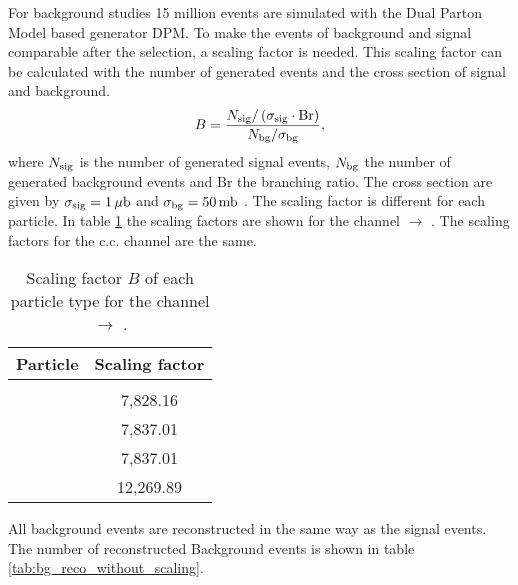 For background studies 15 million events are simulated with the Dual Parton Model based generator DPM.
To make the events of background and signal comparable after the selection, a scaling factor is needed.
This scaling factor can be calculated with the number of generated events and the cross section of signal and background.
\begin{equation}
		B = \frac{N_{\textnormal{sig}}/\left(\sigma_{\textnormal{sig}} \cdot \textnormal{Br}\right)}{N_{\textnormal{bg}}/\sigma_{\textnormal{bg}}},
\label{eq:bg_scaling}
\end{equation}
where $N_{\textnormal{sig}}$ is the number of generated signal events, $N_{\textnormal{bg}}$ the number of generated background events and Br the 
branching ratio. The cross section are given by $\sigma_{\textnormal{sig}} = 1\,\mu\textnormal{b}$ and $\sigma_{\textnormal{bg}} = 50\, \textnormal{mb}$ \cite{PANDAphysics2009}.
The scaling factor is different for each particle.
In table \ref{tab:bg_scaling} the scaling factors are shown for the channel \pbarpSystem $\rightarrow$ \excitedcascade \anticascade.
The scaling factors for the c.c. channel are the same. 

\begin{table}
	\centering
	\caption{Scaling factor $B$ of each particle type for the channel \pbarpSystem $\rightarrow$ \excitedcascade \anticascade.}
	\label{tab:bg_scaling}
	\begin{tabular}{cc}
		\hline
		 Particle & Scaling factor \\
		\hline
		\hline
		&  \\
		\lam & 7,828.16\\
		\anticascade & 7,837.01 \\
		\excitedcascade & 7,837.01\\
		\excitedcascade \anticascade & 12,269.89\\
		\hline
		 
	 \end{tabular}
\end{table}

All background events are reconstructed in the same way as the signal events. The number of reconstructed Background events is 
shown in table \ref{tab:bg_reco_without_scaling}.


